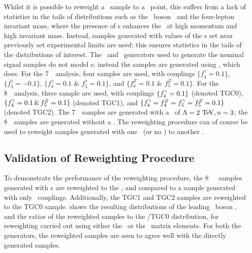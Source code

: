 Whilst it is possible to reweight a \sm\ sample to a \TGC\ point, this suffers
from a lack of statistics in the tails of distributions such as the \Z\ boson \pt\ 
and the four-lepton invariant mass, where the presence of \TGC s
enhances the \cx\ at high momentum and high invariant mass. Instead,
samples generated with values of the \TGC s set near previously set
experimental limits are used; this ensures statistics in the tails of the
distributions of interest. The \powhegbox\ and \ggZZ\ generators used to generate the nominal signal
samples do not model \TGC s; instead the samples are generated using \sherpa,
which does. For the 7~\tev\ analysis, four samples are used, with couplings
 $\{f_{4}^{\gamma}=0.1\}$, $\{f_{5}^{\gamma}=-0.1\}$,
$\{f_{4}^{\gamma}=0.1$ \& $f_{5}^{\gamma}=0.1\}$, and 
$\{f_{4}^{Z}=0.1$ \& $f_5^{Z}=0.1\}$. For the 8~\tev\ analysis, three sample are
used, with couplings $\{f_{4}^{\gamma}=0.1\}$ (denoted TGC0),
$\{f_{4}^{\gamma}=0.1 \,\&\, f_{5}^{Z}=0.1\}$ (denoted TGC1), and 
$\{ f_{4}^{\gamma} = f_{4}^{Z} = f_{5}^{\gamma} = f_{5}^{Z} = 0.1 \}$ (denoted TGC2). The 7~\tev\ samples are
generated with a \formfactor\ of $\Lambda=2\tev,n=3$; the 8~\tev\ samples are
generated without a \formfactor. The reweighting procedure can of course be used to
reweight samples generated with one \formfactor\ (or no \formfactor) to another
\formfactor.

\subsection{Validation of Reweighting Procedure}

To demonstrate the performance of the reweighting procedure, the 8~\tev\ \sherpa\
samples generated with \TGC s are reweighted to the \sm, and
compared to a sample generated with only \sm\ couplings. Additionally, the TGC1 and TGC2
samples are reweighted to the TGC0 sample. \fig{TGC-reweight} shows the
resulting distributions of the leading \Z\ boson \pt, and the ratios of
the reweighted samples to the \sm/TGC0 distribution, for reweighting carried out
using either the \BHO\ or the \BR\ matrix elements. For both the generators, the reweighted samples are seen
to agree well with the directly generated samples.

